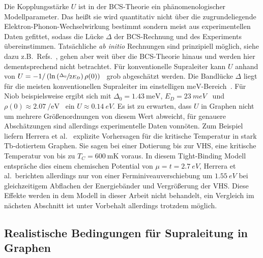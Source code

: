 Die Kopplungsstärke $U$ ist in der BCS-Theorie ein phänomenologischer Modellparameter.
Das heißt sie wird quantitativ nicht über die zugrundeliegende Elektron-Phonon-Wechselwirkung bestimmt sondern meist aus experimentellen Daten gefittet, sodass die Lücke $\Delta$ der BCS-Rechnung und des Experiments übereinstimmen. 
Tatsächliche \textit{ab initio} Rechnungen sind prinzipiell möglich, siehe dazu z.B.\ Refs.~\cite{giustino_electron-phonon_2017,morel_calculation_1962}, gehen aber weit über die BCS-Theorie hinaus und werden hier dementsprechend nicht betrachtet.
Für konventionelle Supraleiter kann $U$ anhand von $U = -1/\left(\ln\left(\sfrac{\Delta_0}{2E_D}\right)\rho(0)\right) $~\cite{czycholl_theoretische_2017} grob abgeschätzt werden.
Die Bandlücke $\Delta$ liegt für die meisten konventionellen Supraleiter im einstelligen $\mathrm{meV}$-Bereich~\cite{croitoru_phonon_2015,czycholl_theoretische_2016}.
Für Niob beispielsweise ergibt sich mit $\Delta_0 = \qty{1.43}{\milli\electronvolt}$, $E_D = \qty{23}{meV}$~\cite{zarea_effects_2023} und $\rho(0) \approx \qty{2.07}{\per\electronvolt}$~\cite{anderson_self-consistent_1973} ein $U \approx \qty{0.14}{eV}$.
Es ist zu erwarten, dass $U$ in Graphen nicht um mehrere Größenordnungen von diesem Wert abweicht, für genauere Abschätzungen sind allerdings experimentelle Daten vonnöten.
Zum Beispiel liefern Herrera et al.\ \cite{herrera_topological_2024} explizite Vorhersagen für die kritische Temperatur in stark $\mathrm{Tb}$-dotiertem Graphen.
Sie sagen bei einer Dotierung bis zur VHS, eine kritische Temperatur von bis zu $T_C = \qty{600}{\milli\kelvin}$ voraus.
In diesem Tight-Binding Modell entspräche dies einem chemischen Potential von $\mu = t = \qty{2.7}{eV}$, Herrera et al.\ berichten allerdings nur von einer Ferminiveauverschiebung um $\qty{1.55}{eV}$ bei gleichzeitigem Abflachen der Energiebänder und Vergrößerung der VHS.
Diese Effekte werden in dem Modell in dieser Arbeit nicht behandelt, ein Vergleich im nächsten Abschnitt ist unter Vorbehalt allerdings trotzdem möglich.



















\subsection{Realistische Bedingungen für Supraleitung in Graphen}\label{sec:graphen_dotierung}

